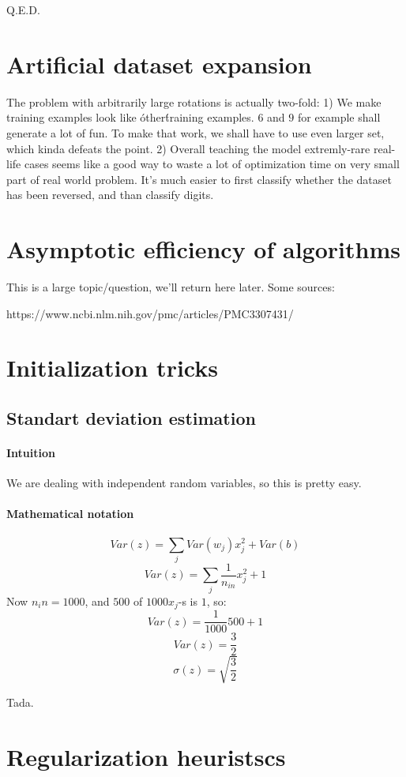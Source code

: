 \documentclass{article}
\begin{document}
Q.E.D.

\section{Artificial dataset expansion}
The problem with arbitrarily large rotations is actually two-fold:
1) We make training examples look like \'other\' training examples. $6$ and $9$ for example shall generate a lot of fun.
To make that work, we shall have to use even larger set, which kinda defeats the point.
2) Overall teaching the model extremly-rare real-life cases seems like a good way
to waste a lot of optimization time on very small part of real world problem. It's much easier to first classify whether the dataset has been reversed, and than classify digits.

\section{Asymptotic efficiency of algorithms}
This is a large topic/question, we'll return here later. Some sources:

https://www.ncbi.nlm.nih.gov/pmc/articles/PMC3307431/

\section{Initialization tricks}
\subsection{Standart deviation estimation}
\paragraph{Intuition}
We are dealing with independent random variables, so this is pretty easy.

\paragraph{Mathematical notation}
$$Var(z) = \sum_j{Var(w_j) x_j^2} + Var(b)$$
$$Var(z) = \sum_j{\frac{1}{n_{in}}x_j^2} + 1$$
Now $n_in = 1000$, and $500$ of $1000 x_j$-s is $1$, so:
$$Var(z) = \frac{1}{1000}500 + 1$$
$$Var(z) = \frac{3}{2}$$
$$\sigma(z) = \sqrt{\frac{3}{2}}$$

Tada.

\section{Regularization heuristscs}
\end{document}
